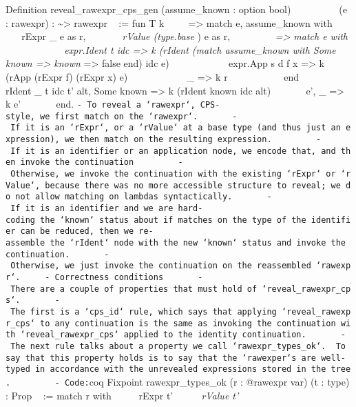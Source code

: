 Definition reveal\_rawexpr\_cps\_gen (assume\_known : option bool) ~ ~ ~
~ ~ ~(e : rawexpr) : \textasciitilde{}\textgreater{} rawexpr ~ := fun T
k ~ ~ ~=\textgreater{} match e, assume\_known with ~ ~ ~ ~ \textbar{}
rExpr \_ e as r, \emph{ ~ ~ ~ ~ \textbar{} rValue (type.base }) e as r,
\emph{ ~ ~ ~ ~ ~ =\textgreater{} match e with ~ ~ ~ ~ ~ ~ ~\textbar{}
expr.Ident t idc =\textgreater{} k (rIdent (match assume\_known with
Some known =\textgreater{} known \textbar{} } =\textgreater{} false end)
idc e) ~ ~ ~ ~ ~ ~ ~\textbar{} expr.App s d f x =\textgreater{} k (rApp
(rExpr f) (rExpr x) e) ~ ~ ~ ~ ~ ~ ~\textbar{} \_ =\textgreater{} k r ~
~ ~ ~ ~ ~ ~end ~ ~ ~ ~ \textbar{} rIdent \_ t idc t' alt, Some known
=\textgreater{} k (rIdent known idc alt) ~ ~ ~ ~ \textbar{} e', \_
=\textgreater{} k e' ~ ~ ~ ~ end.
\texttt{-\ To\ reveal\ a\ `rawexpr`,\ CPS-style,\ we\ first\ match\ on\ the\ `rawexpr`.\ \ \ \ \ \ \ -\ If\ it\ is\ an\ `rExpr`,\ or\ a\ `rValue`\ at\ a\ base\ type\ (and\ thus\ just\ an\ expression),\ we\ then\ match\ on\ the\ resulting\ expression.\ \ \ \ \ \ \ \ \ -\ If\ it\ is\ an\ identifier\ or\ an\ application\ node,\ we\ encode\ that,\ and\ then\ invoke\ the\ continuation\ \ \ \ \ \ \ \ \ -\ Otherwise,\ we\ invoke\ the\ continuation\ with\ the\ existing\ `rExpr`\ or\ `rValue`,\ because\ there\ was\ no\ more\ accessible\ structure\ to\ reveal;\ we\ do\ not\ allow\ matching\ on\ lambdas\ syntactically.\ \ \ \ \ \ \ -\ If\ it\ is\ an\ identifier\ and\ we\ are\ hard-coding\ the\ `known`\ status\ about\ if\ matches\ on\ the\ type\ of\ the\ identifier\ can\ be\ reduced,\ then\ we\ re-assemble\ the\ `rIdent`\ node\ with\ the\ new\ `known`\ status\ and\ invoke\ the\ continuation.\ \ \ \ \ \ \ -\ Otherwise,\ we\ just\ invoke\ the\ continuation\ on\ the\ reassembled\ `rawexpr`.\ \ \ \ \ -\ Correctness\ conditions\ \ \ \ \ \ \ -\ There\ are\ a\ couple\ of\ properties\ that\ must\ hold\ of\ `reveal\_rawexpr\_cps`.\ \ \ \ \ \ \ -\ The\ first\ is\ a\ `cps\_id`\ rule,\ which\ says\ that\ applying\ `reveal\_rawexpr\_cps`\ to\ any\ continuation\ is\ the\ same\ as\ invoking\ the\ continuation\ with\ `reveal\_rawexpr\_cps`\ applied\ to\ the\ identity\ continuation.\ \ \ \ \ \ \ -\ The\ next\ rule\ talks\ about\ a\ property\ we\ call\ `rawexpr\_types\_ok`.\ \ To\ say\ that\ this\ property\ holds\ is\ to\ say\ that\ the\ `rawexper`s\ are\ well-typed\ in\ accordance\ with\ the\ unrevealed\ expressions\ stored\ in\ the\ tree.\ \ \ \ \ \ \ \ \ -\ Code:}coq
Fixpoint rawexpr\_types\_ok (r : @rawexpr var) (t : type) : Prop ~ :=
match r with ~ ~ ~\textbar{} rExpr t' \emph{ ~ ~ ~\textbar{} rValue t' }
